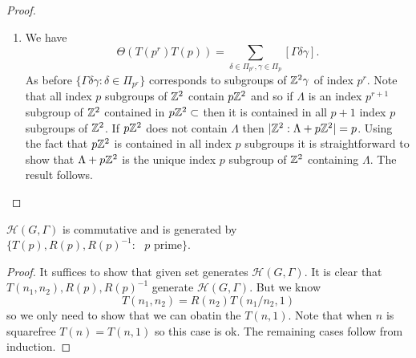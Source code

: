 \documentclass{memoir}
\begin{document}
\begin{proof}
\begin{enumerate}
        \item We have
            \begin{equation}
                \Theta(T(p^r)T(p)) = \sum_{\delta\in\Pi_{p^r},\gamma\in\Pi_p}[\Gamma \delta\gamma].
            \end{equation}
            As before $\{\Gamma\delta\gamma:\delta\in\Pi_{p^r}\}$ corresponds to subgroups of $\mathbb{Z}^2\gamma$ of index $p^r$.
            Note that all index $p$ subgroups of $\mathbb{Z}^2$ contain $p\mathbb{Z}^2$ and so if $\Lambda$ is an index $p^{r+1}$ subgroup of $\mathbb{Z}^2$ contained in $p\mathbb{Z}^2\subset$ then it is contained in all $p+1$ index $p$ subgroups of $\mathbb{Z}^2$.
            If $p\mathbb{Z}^2$ does not contain $\Lambda$ then $|\mathbb{Z}^2:\Lambda+p\mathbb{Z}^2| = p$.
            Using the fact that $p\mathbb{Z}^2$ is contained in all index $p$ subgroups it is straightforward to show that $\Lambda+p\mathbb{Z}^2$ is the unique index $p$ subgroup of $\mathbb{Z}^2$ containing $\Lambda$.
            The result follows.
    \end{enumerate}
\end{proof}
\begin{corollary}
    $\mathcal H(G,\Gamma)$ is commutative and is generated by $\{T(p),R(p),R(p)^{-1}:\text{ $p$ prime}\}$.
\end{corollary}
\begin{proof}
    It suffices to show that given set generates $\mathcal H(G,\Gamma)$.
    It is clear that $T(n_1,n_2), R(p), R(p)^{-1}$ generate $\mathcal H(G,\Gamma)$.
    But we know 
    \begin{equation}
        T(n_1,n_2) = R(n_2)T(n_1/n_2,1)
    \end{equation}
    so we only need to show that we can obatin the $T(n,1)$.
    Note that when $n$ is squarefree $T(n) = T(n,1)$ so this case is ok.
    The remaining cases follow from induction.
\end{proof}
\end{document}
